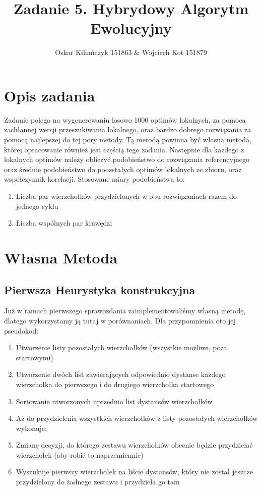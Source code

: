 \documentclass[11pt]{article}
\title{Zadanie 5. Hybrydowy Algorytm Ewolucyjny}
\author{Oskar Kiliańczyk 151863 \& Wojciech Kot 151879}
\date{}
\begin{document}
\maketitle
\newpage

\section{Opis zadania}\label{sec:opis-zadania}
Zadanie polega na wygenerowaniu losowo 1000 optimów lokalnych, za pomocą zachłannej wersji przeszukiwania lokalnego,
oraz bardzo dobrego rozwiązania za pomocą najlepszej do tej pory metody.
Tą metodą powinna być własna metoda, której opracowanie również jest częścią tego zadania.
Następnie dla każdego z lokalnych optimów należy obliczyć podobieństwo do rozwiązania referencyjnego oraz średnie podobieństwo do poozstałych optimów lokalnych ze zbioru, oraz współczynnik korelacji.
Stosowane miary podobieństwa to:
\begin{enumerate}
    \item Liczba par wierzchołków przydzielonych w obu rozwiązaniach razem do jednego cyklu
    \item Liczba wspólnych par krawędzi
\end{enumerate}


\section{Własna Metoda}\label{sec:wasna-metoda}

\subsection{Pierwsza Heurystyka konstrukcyjna}\label{subsec:pierwsza-heurystyka-konstukcyjna}

Już w ramach pierwszego sprawozdania zaimplementowaliśmy własną metodę, dlatego wykorzystamy ją tutaj w porównaniach.
Dla przypomnienia oto jej pseudokod:

\begin{enumerate}
    \item Utworzenie listy pozostałych wierzchołków (wszystkie możliwe, poza startowymi)
    \item Utworzenie dwóch list zawierających odpowiednio dystanse każdego wierzchołka do pierwszego i do drugiego wierzchołka startowego
    \item Sortowanie utworzonych uprzednio list dystansów wierzchołków
    \item Aż do przydzielenia wszystkich wierzchołków z listy pozostałych wierzchołków wykonuje:
    \item Zmianę decyzji, do którego zestawu wierzchołków obecnie będzie przydzielać wierzchołek (aby robić to naprzemiennie)
    \item Wyszukuje pierwszy wierzchołek na liście dystansów, który nie został jeszcze przydzielony do żadnego zestawu i przydziela go tam
\end{enumerate}
\end{document}
